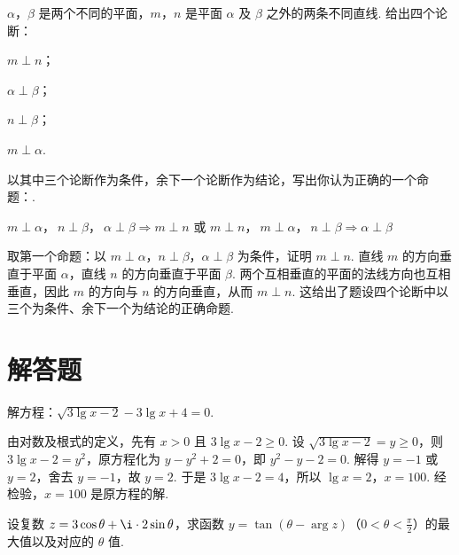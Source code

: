 \begin{problem}
\(\alpha\)，\(\beta\) 是两个不同的平面，\(m\)，\(n\) 是平面 \(\alpha\) 及 \(\beta\) 之外的两条不同直线. 给出四个论断：

\begin{circlelist}
\item \(m\perp n\)；
\item \(\alpha\perp\beta\)；
\item \(n\perp\beta\)；
\item \(m\perp\alpha\).
\end{circlelist}

以其中三个论断作为条件，余下一个论断作为结论，写出你认为正确的一个命题：\fillinblank{}.
\end{problem}

\begin{answer}
\(m\perp\alpha\)，\(\ n\perp\beta\)，\(\ \alpha\perp\beta\Rightarrow m\perp n\) 或 \(m\perp n\)，\(\ m\perp\alpha\)，\(\ n\perp\beta\Rightarrow \alpha\perp\beta\)
\end{answer}

\begin{solution}
取第一个命题：以 \(m\perp\alpha\)，\(n\perp\beta\)，\(\alpha\perp\beta\) 为条件，证明 \(m\perp n\). 直线 \(m\) 的方向垂直于平面 \(\alpha\)，直线 \(n\) 的方向垂直于平面 \(\beta\). 两个互相垂直的平面的法线方向也互相垂直，因此 \(m\) 的方向与 \(n\) 的方向垂直，从而
\(m\perp n\). 这给出了题设四个论断中以三个为条件、余下一个为结论的正确命题.
\end{solution}

\section{解答题}

\begin{problem}
解方程：\(\sqrt{3\lg x-2}-3\lg x+4=0\).
\end{problem}

\begin{solution}
由对数及根式的定义，先有 \(x>0\) 且 \(3\lg x-2\ge0\). 设 \(\sqrt{3\lg x-2}=y\ge 0\)，则 \(3\lg x-2=y^2\)，原方程化为 \(y-y^2+2=0\)，即 \(y^2-y-2=0\). 解得 \(y=-1\) 或 \(y=2\)，舍去 \(y=-1\)，故 \(y=2\).
于是 \(3\lg x-2=4\)，所以 \(\lg x=2\)，\(x=100\). 经检验，\(x=100\) 是原方程的解.
\end{solution}

\begin{problem}
设复数 \(z=3\cos\theta+\i\cdot 2\sin\theta\)，求函数 \(y=\tan(\theta-\arg z)\)（\(0<\theta<\frac{\pi}{2}\)）的最大值以及对应的 \(\theta\) 值.
\end{problem}

